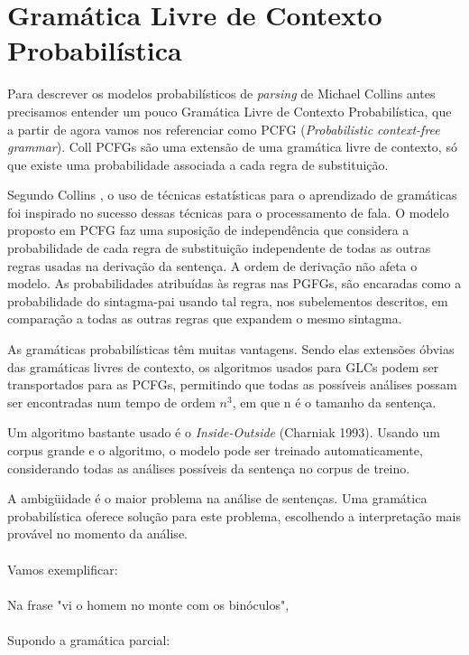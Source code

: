 \section{Gramática Livre de Contexto Probabilística}
\label{sec:pcfg}

Para descrever os modelos  probabilísticos  de \emph{parsing} de Michael Collins   antes precisamos entender um pouco Gramática Livre de Contexto Probabilística, que a partir de agora vamos nos referenciar como PCFG (\emph{Probabilistic context-free grammar}).
Coll
PCFGs são uma extensão de uma gramática livre de contexto, só que existe uma probabilidade associada a cada regra de substituição.

Segundo Collins \cite{collins99}, o uso de técnicas estatísticas para o aprendizado de gramáticas foi inspirado no sucesso dessas técnicas para o processamento de fala. O modelo proposto em PCFG faz uma suposição de independência que considera a probabilidade de cada regra de substituição independente de todas as outras regras usadas na derivação da sentença. A ordem de derivação não afeta o modelo. As probabilidades atribuídas às regras nas PGFGs, são encaradas como a probabilidade do sintagma-pai usando tal regra, nos subelementos descritos, em comparação a todas as outras regras que expandem o mesmo sintagma.

As gramáticas probabilísticas têm muitas vantagens. Sendo elas extensões óbvias das gramáticas livres de contexto, os algoritmos usados para GLCs podem ser transportados para as PCFGs, permitindo que todas as possíveis análises possam ser encontradas num tempo de ordem $n^3$, em que n é o tamanho da sentença.

Um algoritmo bastante usado é o \emph{Inside-Outside} (Charniak 1993). Usando um corpus grande e o algoritmo, o modelo pode ser treinado automaticamente, considerando todas as análises possíveis da sentença no corpus de treino.

A ambigüidade é o maior problema na análise de sentenças. Uma gramática probabilística oferece solução para este problema, escolhendo a interpretação mais provável no momento da análise.
\\ \\
Vamos exemplificar:
\\ \\

Na frase "vi o homem no monte com os binóculos",
\\ \\

Supondo a gramática parcial:

